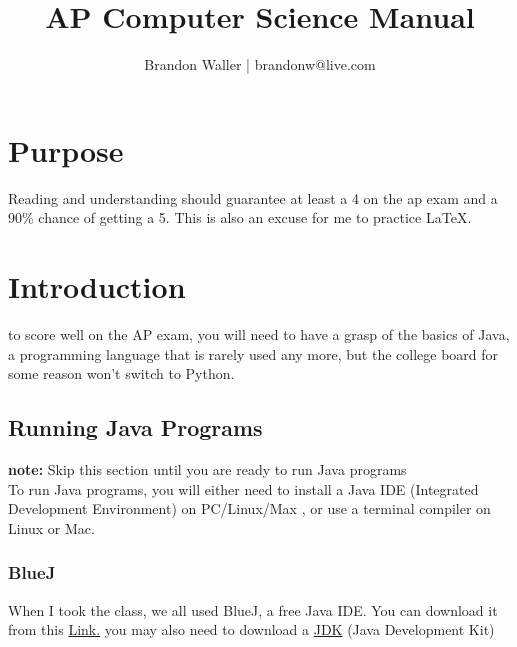 \documentclass{article}
\begin{document}
\title{AP Computer Science Manual}
\author{Brandon Waller | brandonw@live.com}

\maketitle

\tableofcontents

\section{Purpose}
Reading and understanding should guarantee at least a 4 on the ap exam and a 90\% chance of getting a 5. This is also an excuse for me to practice \LaTeX. 

\section{Introduction}
to score well on the AP exam, you will need to have a grasp of the basics of Java, a programming language that is rarely used any more, but the college board for some reason won't switch to Python. 

\subsection{Running Java Programs}
\textbf{note:} Skip this section until you are ready to run Java programs\\
To run Java programs, you will either need to install a Java IDE (Integrated Development Environment) on PC/Linux/Max , or use a terminal compiler on Linux or Mac.

\subsubsection{BlueJ}
When I took the class, we all used BlueJ, a free Java IDE. You can download it from this \href{https://www.bluej.org/}{Link.} you may also need to download a \href{http://www.oracle.com/technetwork/java/javase/downloads/jdk8-downloads-2133151.html}{JDK} (Java Development Kit)
\end{document}
